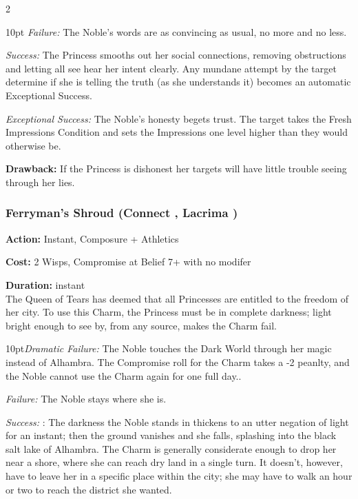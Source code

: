 \begin{multicols}{2}
\begin{myindentpar}{10pt}
	\emph{Failure:} The Noble's words are as convincing as usual, no more and no less.
    
	\emph{Success:} The Princess smooths out her social connections, removing obstructions and letting all see hear her intent clearly. Any mundane attempt by the target determine if she is telling the truth (as she understands it) becomes an automatic Exceptional Success. 
    
	\emph{Exceptional Success:} The Noble's honesty begets trust. The target takes the Fresh Impressions Condition and sets the Impressions one level higher than they would otherwise be. \end{myindentpar}
	
\noindent \textbf{Drawback:} If the Princess is dishonest her targets will have little trouble seeing through her lies. 

\subsubsection*{Ferryman's Shroud (Connect \textbullet\textbullet\textbullet, Lacrima \textbullet)}

\noindent \textbf{Action:} Instant, Composure + Athletics

\noindent \textbf{Cost:} 2 Wisps, Compromise at Belief 7+ with no modifer

\noindent \textbf{Duration:} instant \\

\noindent The Queen of Tears has deemed that all Princesses are entitled to the freedom of her city. To use this Charm, the Princess must be in complete darkness; light bright enough to see by, from any source, makes the Charm fail. 

\begin{myindentpar}{10pt}\emph{Dramatic Failure:} The Noble touches the Dark World through her magic instead of Alhambra. The Compromise roll for the Charm takes a -2 peanlty, and the Noble cannot use the Charm again for one full day..
    
	\emph{Failure:} The Noble stays where she is.
    
	\emph{Success:} : The darkness the Noble stands in thickens to an utter negation of light for an instant; then the ground vanishes and she falls, splashing into the black salt lake of Alhambra. The Charm is generally considerate enough to drop her near a shore, where she can reach dry land in a single turn. It doesn’t, however, have to leave her in a specific place within the city; she may have to walk an hour or two to reach the district she wanted.
    

\end{myindentpar}
\end{multicols}

